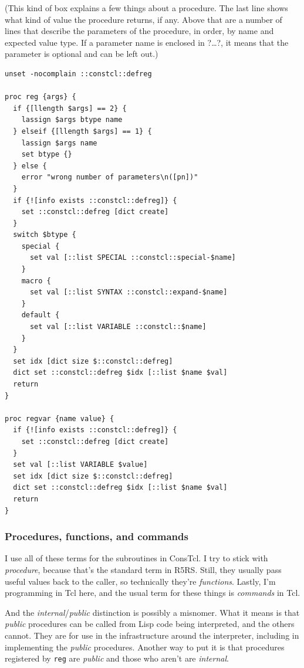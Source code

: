 \documentclass[a5paper,draft]{memoir}
\begin{document}
(This kind of box explains a few things about a procedure. The last line shows what kind of value the procedure returns, if any. Above that are a number of lines that describe the parameters of the procedure, in order, by name and expected value type. If a parameter name is enclosed in ?\ldots ?, it means that the parameter is optional and can be left out.)

\begin{lstlisting}
unset -nocomplain ::constcl::defreg

proc reg {args} {
  if {[llength $args] == 2} {
    lassign $args btype name
  } elseif {[llength $args] == 1} {
    lassign $args name
    set btype {}
  } else {
    error "wrong number of parameters\n([pn])"
  }
  if {![info exists ::constcl::defreg]} {
    set ::constcl::defreg [dict create]
  }
  switch $btype {
    special {
      set val [::list SPECIAL ::constcl::special-$name]
    }
    macro {
      set val [::list SYNTAX ::constcl::expand-$name]
    }
    default {
      set val [::list VARIABLE ::constcl::$name]
    }
  }
  set idx [dict size $::constcl::defreg]
  dict set ::constcl::defreg $idx [::list $name $val]
  return
}

proc regvar {name value} {
  if {![info exists ::constcl::defreg]} {
    set ::constcl::defreg [dict create]
  }
  set val [::list VARIABLE $value]
  set idx [dict size $::constcl::defreg]
  dict set ::constcl::defreg $idx [::list $name $val]
  return
}
\end{lstlisting}

\begin{pulledtext}

\subsubsection{Procedures, functions, and commands}
\label{procedures-functions-and-commands}

I use all of these terms for the subroutines in ConsTcl. I try to stick with \emph{procedure}, because that's the standard term in R5RS. Still, they usually pass useful values back to the caller, so technically they're \emph{functions}. Lastly, I'm programming in Tcl here, and the usual term for these things is \emph{commands} in Tcl.

And the \emph{internal}/\emph{public} distinction is possibly a misnomer. What it means is that \emph{public} procedures can be called from Lisp code being interpreted, and the others cannot. They are for use in the infrastructure around the interpreter, including in implementing the \emph{public} procedures. Another way to put it is that procedures registered by \texttt{reg} are \emph{public} and those who aren't are \emph{internal}.
\end{pulledtext}
\end{document}
